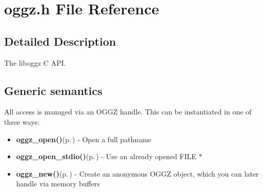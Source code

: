 \section{oggz.h File Reference}
\label{oggz_8h}


\subsection{Detailed Description}
The liboggz C API. 

\subsection{Generic semantics}\label{general}
All access is managed via an OGGZ handle. This can be instantiated in one of three ways:

\begin{itemize}
\item {\bf oggz\_\-open()}{\rm (p.\,\pageref{oggz_8h_a5})} - Open a full pathname\item {\bf oggz\_\-open\_\-stdio()}{\rm (p.\,\pageref{oggz_8h_a6})} - Use an already opened FILE $\ast$\item {\bf oggz\_\-new()}{\rm (p.\,\pageref{oggz_8h_a4})} - Create an anonymous OGGZ object, which you can later handle via memory buffers\end{itemize}


